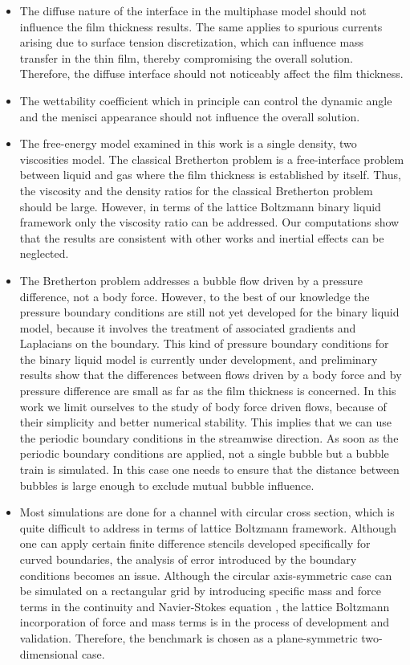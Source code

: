\documentclass[preprint,12pt]{elsarticle}
\begin{document}
\begin{itemize}
 \item The diffuse nature of the interface in the multiphase model should not
influence the film thickness results.  The same applies to spurious
currents arising due to surface tension discretization, which
can influence mass transfer in the thin film, thereby compromising the
overall solution. Therefore, the diffuse interface should not noticeably affect the film
thickness.
 \item The wettability coefficient which in principle can control the
dynamic angle and the menisci appearance \cite{pagonabarraga-finger} should not
influence the overall solution.
 \item The free-energy model examined in this work is a single density, two
viscosities model. The classical Bretherton problem is a free-interface problem between liquid and
gas
where the film thickness is established by itself. Thus, the viscosity and the density ratios for
the
classical
Bretherton problem should
be large. However, in terms of the lattice Boltzmann binary liquid framework only the viscosity
ratio can be addressed. Our computations show that the results are consistent with other works and
inertial effects can be neglected.
  \item The Bretherton problem addresses a bubble flow driven by a pressure
difference, not a body force. However, to the best of our knowledge the pressure boundary
conditions are still not yet developed for the binary liquid model, because it involves the
treatment of associated gradients and Laplacians on the boundary.
This kind of pressure boundary conditions for the binary liquid model is currently
under development, and preliminary results show that the differences between flows driven by a body
force and by
pressure difference are small as far as the film
 thickness is concerned.  In this work we limit ourselves to the study
of body force driven flows, because of their simplicity and better numerical stability. This
implies that we can use the periodic boundary conditions in the streamwise direction. As soon as the
periodic boundary
conditions are applied, not a single bubble but a bubble train is simulated. In this case one
needs
to ensure that the distance between bubbles is large enough to exclude mutual bubble influence.
 \item Most simulations are done for a channel with circular cross section,
which is quite difficult to address in terms of lattice Boltzmann framework.
Although one can apply certain finite difference stencils
\cite{arnold-boundary,hunt-boundary} developed specifically for curved boundaries,
the analysis of error introduced by the boundary conditions becomes an issue. Although the circular
axis-symmetric case can be simulated on a rectangular grid by introducing specific mass and force
terms in the continuity and Navier-Stokes equation \cite{halliday-circular}, the lattice Boltzmann
incorporation of force and mass terms is in the process of development and validation. Therefore,
the benchmark is chosen as a plane-symmetric two-dimensional case.  
\end{itemize}
\end{document}
